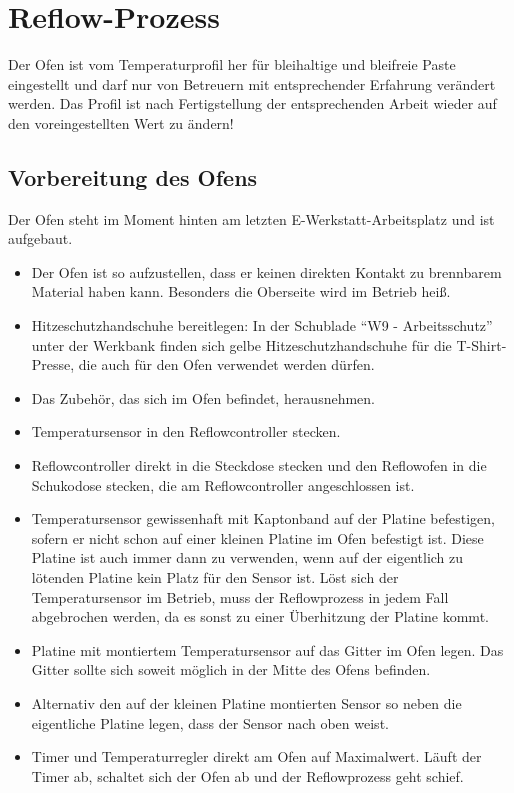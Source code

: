 \documentclass{\basedir/fablab-document}
\begin{document}
\section{Reflow-Prozess}
Der Ofen ist vom Temperaturprofil her für bleihaltige und bleifreie Paste eingestellt und darf nur von Betreuern mit entsprechender Erfahrung verändert werden. Das Profil ist nach Fertigstellung der entsprechenden Arbeit wieder auf den voreingestellten Wert zu ändern!

\subsection{Vorbereitung des Ofens}
Der Ofen steht im Moment hinten am letzten E-Werkstatt-Arbeitsplatz und ist aufgebaut.
\begin{itemize}
	\item Der Ofen ist so aufzustellen, dass er keinen direkten Kontakt zu brennbarem Material haben kann. Besonders die Oberseite wird im Betrieb heiß.
	\item Hitzeschutzhandschuhe bereitlegen: In der Schublade \enquote{W9 - Arbeitsschutz} unter der Werkbank finden sich gelbe Hitzeschutzhandschuhe für die T-Shirt-Presse, die auch für den Ofen verwendet werden dürfen.
	\item Das Zubehör, das sich im Ofen befindet, herausnehmen.
	\item Temperatursensor in den Reflowcontroller stecken.
	\item Reflowcontroller direkt in die Steckdose stecken und den Reflowofen in die Schukodose stecken, die am Reflowcontroller angeschlossen ist.
	\item Temperatursensor gewissenhaft mit Kaptonband auf der Platine befestigen, sofern er nicht schon auf einer kleinen Platine im Ofen befestigt ist. Diese Platine ist auch immer dann zu verwenden, wenn auf der eigentlich zu lötenden Platine kein Platz für den Sensor ist. Löst sich der Temperatursensor im Betrieb, muss der Reflowprozess in jedem Fall abgebrochen werden, da es sonst zu einer Überhitzung der Platine kommt.
	\item Platine mit montiertem Temperatursensor auf das Gitter im Ofen legen. Das Gitter sollte sich soweit möglich in der Mitte des Ofens befinden.
	\item Alternativ den auf der kleinen Platine montierten Sensor so neben die eigentliche Platine legen, dass der Sensor nach oben weist.
	\item Timer und Temperaturregler direkt am Ofen auf Maximalwert. Läuft der Timer ab, schaltet sich der Ofen ab und der Reflowprozess geht schief.
\end{itemize}
\end{document}
